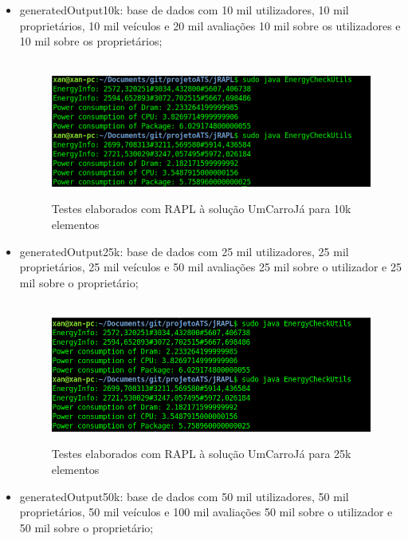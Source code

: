\begin{itemize}  
    \item generatedOutput10k: base de dados com 10 mil utilizadores, 10 mil proprietários, 10 mil veículos e 20 mil avaliações 10 mil sobre os utilizadores e 10 mil sobre os proprietários;
    
        \begin{figure}[H]
            \hbox{\hspace{-8em} \includegraphics[width=1.4\textwidth]{images/rapl_10k_v1.png}}
            \label{fig53}
            \caption{Testes elaborados com RAPL à solução UmCarroJá para 10k elementos}
        \end{figure}
        
    \item generatedOutput25k: base de dados com 25 mil utilizadores, 25 mil proprietários, 25 mil veículos e 50 mil avaliações 25 mil sobre o utilizador e 25 mil sobre o proprietário;
    
        \begin{figure}[H]
            \hbox{\hspace{-8em} \includegraphics[width=1.4\textwidth]{images/rapl_25k_v1.png}}
            \label{fig54}
            \caption{Testes elaborados com RAPL à solução UmCarroJá para 25k elementos}
        \end{figure}
        
    \item generatedOutput50k: base de dados com 50 mil utilizadores, 50 mil proprietários, 50 mil veículos e 100 mil avaliações 50 mil sobre o utilizador e 50 mil sobre o proprietário;
    

\end{itemize}

